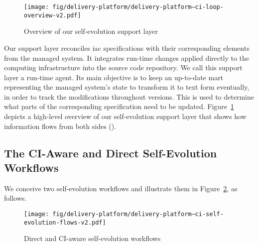 \begin{figure}[h]
	\centering
	\texttt{[image: fig/delivery-platform/delivery-platform--ci-loop-overview-v2.pdf]}
	\caption{Overview of our self-evolution support layer}
	\label{fig:delivery-platform--ci-loop-overview}
\end{figure}

Our support layer reconciles \gls{iac} specifications with their corresponding elements from the managed system. It integrates run-time changes applied directly to the computing infrastructure into the source code repository. We call this support layer a run-time agent. Its main objective is to keep an up-to-date \gls{mart} representing the managed system's state to transform it to text form eventually, in order to track the modifications throughout versions. This is used to determine what parts of the corresponding specification need to be updated. Figure~\ref{fig:delivery-platform--ci-loop-overview} depicts a high-level overview of our self-evolution support layer that shows how information flows from both sides ().

\subsection{The CI-Aware and Direct Self-Evolution Workflows}
\label{subsect:delivery-platform--self-evolution-workflows}

\noindent We conceive two self-evolution workflows and illustrate them in Figure~\ref{fig:delivery-platform--ci-self-evolution-flows}, as follows.

\begin{figure}[h]
	\centering
	\texttt{[image: fig/delivery-platform/delivery-platform--ci-self-evolution-flows-v2.pdf]}
	\caption{Direct and CI-aware self-evolution workflows}
	\label{fig:delivery-platform--ci-self-evolution-flows}
\end{figure}

